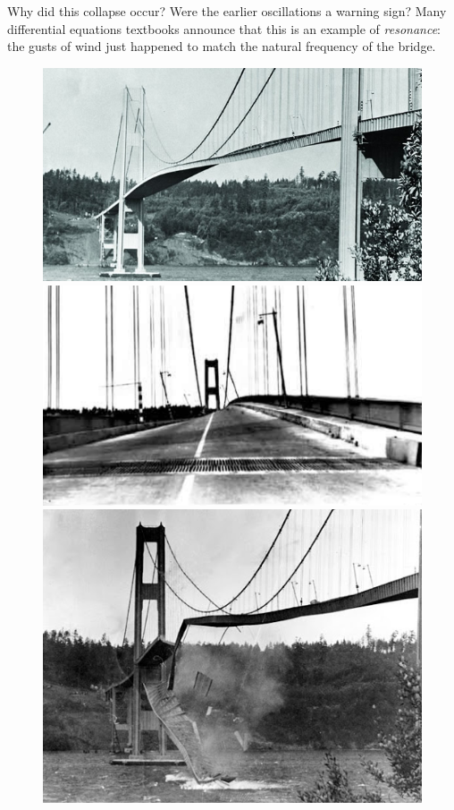 \documentclass{article}
\theoremstyle{definition}
\begin{document}
Why did this collapse occur? Were the earlier oscillations a warning
sign? Many differential equations textbooks announce that this is an
example of {\it resonance}: the gusts of wind just happened to match the
natural frequency of the bridge.
\begin{figure}[!htb]
  \includegraphics[width=\linewidth]{tac01}
\endminipage\hfill
{}
  \includegraphics[width=\linewidth]{tac02}
\endminipage\hfill
{}%
  \includegraphics[width=\linewidth]{tac03}
\endminipage
\end{figure}
\end{document}
